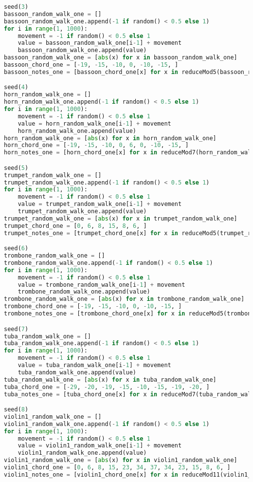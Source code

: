 \begin{lstlisting}[language=Python, caption=Tianshu Segment\_III]
seed(3)
bassoon_random_walk_one = []
bassoon_random_walk_one.append(-1 if random() < 0.5 else 1)
for i in range(1, 1000):
    movement = -1 if random() < 0.5 else 1
    value = bassoon_random_walk_one[i-1] + movement
    bassoon_random_walk_one.append(value)
bassoon_random_walk_one = [abs(x) for x in bassoon_random_walk_one]
bassoon_chord_one = [-19, -15, -10, 0, -10, -15, ]
bassoon_notes_one = [bassoon_chord_one[x] for x in reduceMod5(bassoon_random_walk_one)]

seed(4)
horn_random_walk_one = []
horn_random_walk_one.append(-1 if random() < 0.5 else 1)
for i in range(1, 1000):
    movement = -1 if random() < 0.5 else 1
    value = horn_random_walk_one[i-1] + movement
    horn_random_walk_one.append(value)
horn_random_walk_one = [abs(x) for x in horn_random_walk_one]
horn_chord_one = [-19, -15, -10, 0, 6, 0, -10, -15, ]
horn_notes_one = [horn_chord_one[x] for x in reduceMod7(horn_random_walk_one)]

seed(5)
trumpet_random_walk_one = []
trumpet_random_walk_one.append(-1 if random() < 0.5 else 1)
for i in range(1, 1000):
    movement = -1 if random() < 0.5 else 1
    value = trumpet_random_walk_one[i-1] + movement
    trumpet_random_walk_one.append(value)
trumpet_random_walk_one = [abs(x) for x in trumpet_random_walk_one]
trumpet_chord_one = [0, 6, 8, 15, 8, 6, ]
trumpet_notes_one = [trumpet_chord_one[x] for x in reduceMod5(trumpet_random_walk_one)]

seed(6)
trombone_random_walk_one = []
trombone_random_walk_one.append(-1 if random() < 0.5 else 1)
for i in range(1, 1000):
    movement = -1 if random() < 0.5 else 1
    value = trombone_random_walk_one[i-1] + movement
    trombone_random_walk_one.append(value)
trombone_random_walk_one = [abs(x) for x in trombone_random_walk_one]
trombone_chord_one = [-19, -15, -10, 0, -10, -15, ]
trombone_notes_one = [trombone_chord_one[x] for x in reduceMod5(trombone_random_walk_one)]

seed(7)
tuba_random_walk_one = []
tuba_random_walk_one.append(-1 if random() < 0.5 else 1)
for i in range(1, 1000):
    movement = -1 if random() < 0.5 else 1
    value = tuba_random_walk_one[i-1] + movement
    tuba_random_walk_one.append(value)
tuba_random_walk_one = [abs(x) for x in tuba_random_walk_one]
tuba_chord_one = [-29, -20, -19, -15, -10, -15, -19, -20, ]
tuba_notes_one = [tuba_chord_one[x] for x in reduceMod7(tuba_random_walk_one)]

seed(8)
violin1_random_walk_one = []
violin1_random_walk_one.append(-1 if random() < 0.5 else 1)
for i in range(1, 1000):
    movement = -1 if random() < 0.5 else 1
    value = violin1_random_walk_one[i-1] + movement
    violin1_random_walk_one.append(value)
violin1_random_walk_one = [abs(x) for x in violin1_random_walk_one]
violin1_chord_one = [0, 6, 8, 15, 23, 34, 37, 34, 23, 15, 8, 6, ]
violin1_notes_one = [violin1_chord_one[x] for x in reduceMod11(violin1_random_walk_one)]


\end{lstlisting}
